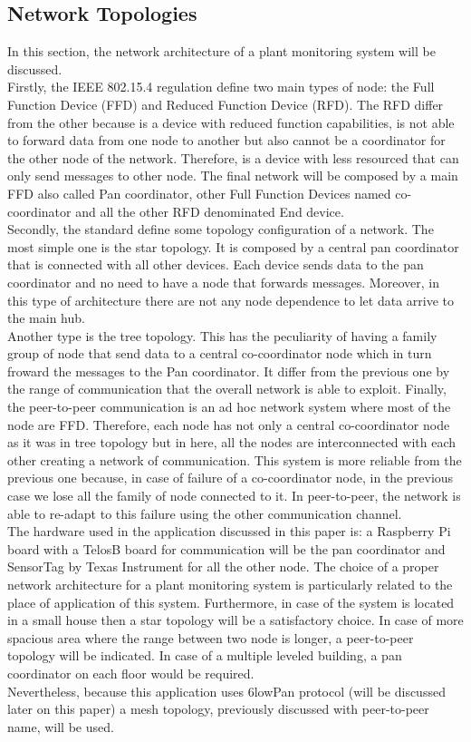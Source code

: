 \subsection{Network Topologies}
In this section, the network architecture of a plant monitoring system will be discussed. \\
Firstly, the IEEE 802.15.4 regulation define two main types of node: the Full Function Device (FFD) and Reduced Function Device (RFD). The RFD differ from the other because is a device with reduced function capabilities, is not able to forward data from one node to another but also cannot be a coordinator for the other node of the network. Therefore, is a device with less resourced that can only send messages to other node. The final network will be composed by a main FFD also called Pan coordinator, other Full Function Devices named co-coordinator and all the other RFD denominated End device. \cite{802-15-4} \\
Secondly, the standard define some topology configuration of a network. The most simple one is the star topology. It is composed by a central pan coordinator that is connected with all other devices. Each device sends data to the pan coordinator and no need to have a node that forwards messages. Moreover, in this type of architecture there are not any node dependence to let data arrive to the main hub.\\
Another type is the tree topology. This has the peculiarity of having a family group of node that send data to a central co-coordinator node which in turn froward the messages to the Pan coordinator. It differ from the previous one by the range of communication that the overall network is able to exploit.
Finally, the peer-to-peer communication is an ad hoc network system where most of the node are FFD. Therefore, each node has not only a central co-coordinator node as it was in tree topology but in here, all the nodes are interconnected with each other creating a network of communication. This system is more reliable from the previous one because, in case of failure of a co-coordinator node, in the previous case we lose all the family of node connected to it. In peer-to-peer, the network is able to re-adapt to this failure using the other communication channel. \cite{slide}\\
The hardware used in the application discussed in this paper is: a Raspberry Pi board with a TelosB board for communication will be the pan coordinator and SensorTag by Texas Instrument for all the other node. The choice of a proper network architecture for a plant monitoring system is particularly related to the place of application of this system. Furthermore, in case of the system is located in a small house then a star topology will be a satisfactory choice. In case of more spacious area where the range between two node is longer, a peer-to-peer topology will be indicated. In case of a multiple leveled building, a pan coordinator on each floor would be required.\\
Nevertheless, because this application uses 6lowPan protocol (will be discussed later on this paper) a mesh topology, previously discussed with peer-to-peer name, will be used.
\\

